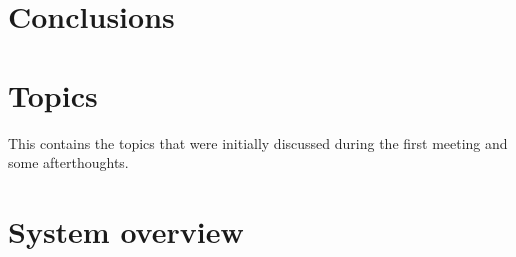 \documentclass{vldb}
\begin{document}



\section{Conclusions}




\null\newpage\null

\null\newpage\null

\section{Topics}

This contains the topics that were initially discussed during the first meeting and some afterthoughts.

\section{System overview}
\end{document}
